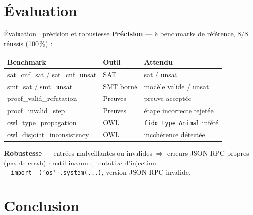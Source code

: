 \documentclass[10pt,aspectratio=169]{beamer}
\begin{document}
\section{Évaluation}

\begin{frame}{Évaluation : précision et robustesse}
  \textbf{Précision} --- 8 benchmarks de référence, \alert{8/8 réussis (100\,\%)} :
  \vspace{0.2cm}
  \begin{center}
  \small
  \begin{tabular}{lll}
    \toprule
    \textbf{Benchmark} & \textbf{Outil} & \textbf{Attendu} \\
    \midrule
    sat\_cnf\_sat / sat\_cnf\_unsat & SAT & sat / unsat \\
    smt\_sat / smt\_unsat & SMT borné & modèle valide / unsat \\
    proof\_valid\_refutation & Preuves & preuve acceptée \\
    proof\_invalid\_step & Preuves & étape incorrecte rejetée \\
    owl\_type\_propagation & OWL & \texttt{fido type Animal} inféré \\
    owl\_disjoint\_inconsistency & OWL & incohérence détectée \\
    \bottomrule
  \end{tabular}
  \end{center}
  \vfill
  \textbf{Robustesse} --- entrées malveillantes ou invalides
  $\Rightarrow$ erreurs JSON-RPC propres (pas de crash) :
  outil inconnu, tentative d'injection
  \texttt{\_\_import\_\_('os').system(...)}, version JSON-RPC invalide.
\end{frame}

\section{Conclusion}
\end{document}
